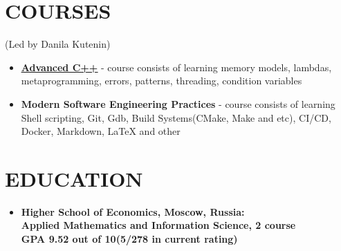 \documentclass[paper=a4,fontsize=15pt]{scrartcl} %
\newcommand{\NewPart}[2]{\section*{\uppercase{#1} \small \normalfont #2}}
\begin{document}
\NewPart{Courses}{}(Led by Danila Kutenin)

\begin{itemize}
  \item \textbf{\href{https://github.com/DenisOstashov/cpp-advanced-hse}{\underline{Advanced C++}}} - course consists of learning memory models, lambdas, metaprogramming, errors, patterns, threading, condition variables
  
 \item \textbf{Modern Software Engineering Practices} - course consists of learning Shell scripting, Git, Gdb, Build Systems(CMake, Make and etc), CI/CD, Docker, Markdown, LaTeX and other
  
\end{itemize}


\NewPart{Education}{}

\begin{itemize}

\item \textbf{Higher School of Economics, Moscow, Russia:\\Applied Mathematics and Information Science, 2 course\\GPA 9.52 out of 10(5/278 in	current rating)} 
\end{itemize}
\end{document}
